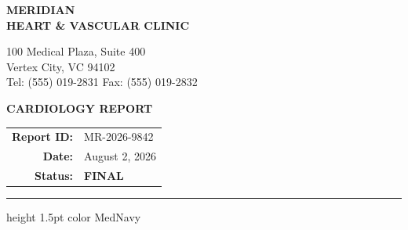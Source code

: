 \documentclass[10pt,letterpaper]{article}
\begin{document}
\noindent
\begin{minipage}[t]{0.6\textwidth}
    {\selectfont\bfseries\Huge\color{MedNavy} MERIDIAN} \\
    {\selectfont\bfseries\large\color{MedTeal} HEART \& VASCULAR CLINIC} \\
    \vspace{0.1cm}
    \begin{small}
        \color{MedGray}
        100 Medical Plaza, Suite 400 \\
        Vertex City, VC 94102 \\
        Tel: (555) 019-2831 \quad Fax: (555) 019-2832
    \end{small}
\end{minipage}
\begin{minipage}[t]{0.4\textwidth}
    \raggedleft
    \vspace{0.1cm}
    {\selectfont\bfseries\Large\color{MedNavy} CARDIOLOGY REPORT} \\
    \vspace{0.2cm}
    \begin{tabular}{rl}
        \textbf{Report ID:} & MR-2026-9842 \\
        \textbf{Date:}      & August 2, 2026 \\
        \textbf{Status:}    & \color{MedTeal}\textbf{FINAL}
    \end{tabular}
\end{minipage}

\vspace{0.4cm}
\hrule height 1.5pt color MedNavy
\vspace{0.4cm}







\clearpage
\nocite{*}


\end{document}
